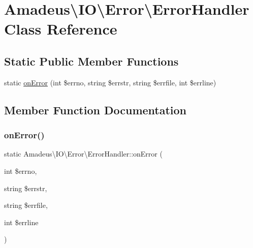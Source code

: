\hypertarget{classAmadeus_1_1IO_1_1Error_1_1ErrorHandler}{}\section{Amadeus\textbackslash{}IO\textbackslash{}Error\textbackslash{}Error\+Handler Class Reference}
\label{classAmadeus_1_1IO_1_1Error_1_1ErrorHandler}
\subsection*{Static Public Member Functions}
\begin{DoxyCompactItemize}
\item 
static \hyperlink{classAmadeus_1_1IO_1_1Error_1_1ErrorHandler_abbf7c4018e926167e27c0fae04ecb6df}{on\+Error} (int \$errno, string \$errstr, string \$errfile, int \$errline)
\end{DoxyCompactItemize}


\subsection{Member Function Documentation}
\mbox{\label{classAmadeus_1_1IO_1_1Error_1_1ErrorHandler_abbf7c4018e926167e27c0fae04ecb6df}} 
\subsubsection{\texorpdfstring{on\+Error()}{onError()}}
{\footnotesize\ttfamily static Amadeus\textbackslash{}\+I\+O\textbackslash{}\+Error\textbackslash{}\+Error\+Handler\+::on\+Error (\begin{DoxyParamCaption}\item[{int}]{\$errno,  }\item[{string}]{\$errstr,  }\item[{string}]{\$errfile,  }\item[{int}]{\$errline }\end{DoxyParamCaption})\hspace{0.3cm}{\ttfamily [static]}}


